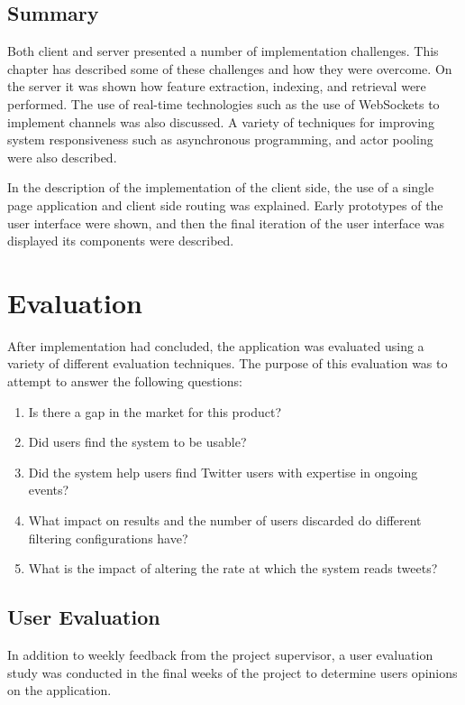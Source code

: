 \documentclass{l4proj}
\begin{document}
        
    \section{Summary}
    Both client and server presented a number of implementation challenges. This chapter has described some of these challenges and how they were overcome. On the server it was shown how feature extraction, indexing, and retrieval were performed. The use of real-time technologies such as the use of WebSockets to implement channels was also discussed. A variety of techniques for improving system responsiveness such as asynchronous programming, and actor pooling were also described.
    
    In the description of the implementation of the client side, the use of a single page application and client side routing was explained. Early prototypes of the user interface were shown, and then the final iteration of the user interface was displayed its components were described.        
        
        
\chapter{Evaluation}

After implementation had concluded, the application was evaluated using a variety of different evaluation techniques. The purpose of this evaluation was to attempt to answer the following questions:

\begin{enumerate}
\item Is there a gap in the market for this product?
\item Did users find the system to be usable?
\item Did the system help users find Twitter users with expertise in ongoing events?
\item What impact on results and the number of users discarded do different filtering configurations have?
\item What is the impact of altering the rate at which the system reads tweets?
\end{enumerate}


\section{User Evaluation}

    In addition to weekly feedback from the project supervisor, a user evaluation study was conducted in the final weeks of the project to determine users opinions on the application.
\end{document}
